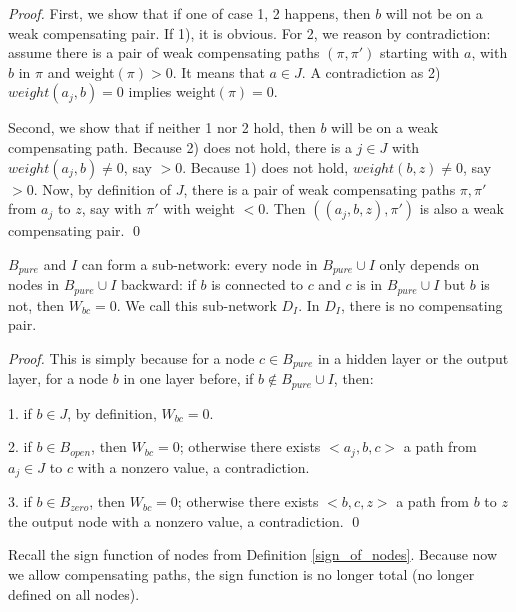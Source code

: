 			\begin{proof}
				First, we show that if one of case 1, 2 happens, then $b$ will not be on a weak compensating pair. If 1), it is obvious. For 2, we reason by contradiction: assume there is a pair of weak compensating paths 	$(\pi,\pi')$ starting with $a$, with $b$ in $\pi$ and weight$(\pi) > 0$. It means that $a \in J$. A contradiction as 2) $weight({a_j,b})=0$ implies weight$(\pi)=0$.
				
				Second, we show that if neither 1 nor 2 hold, then $b$ will be on a weak compensating path.
				Because 2) does not hold, there is a $j \in J$ with $weight({a_j,b}) \neq 0$, say $>0$.
				Because 1) does not hold, $weight({b,z}) \neq 0$, say $>0$.
				Now, by definition of $J$, there is a pair of weak compensating paths $\pi,\pi'$ 
				from $a_j$ to $z$, say with $\pi'$ with weight $<0$.
				Then $((a_j,b,z), \pi')$ is also a weak compensating pair. \qed
			\end{proof}
			
			\begin{lemma}\label{lem:subnetwork}
				$B_{pure}$ and $I$ can form a sub-network: every node in $B_{pure}\cup I$ only depends on nodes in $B_{pure}\cup I$ backward: if $b$ is connected to $c$ and $c$ is in $B_{pure}\cup I$ but $b$ is not, then $W_{bc}=0$. We call this sub-network $D_I$. In $D_I$, there is no compensating pair.
			\end{lemma}
			
			\begin{proof}
				This is simply because for a node $c\in B_{pure}$ in a hidden layer or the output layer, for a node $b$ in one layer before, if $b\notin B_{pure}\cup I$, then:
				
				1. if $b\in J$, by definition, $W_{bc}=0$.
				
				2. if $b\in B_{open}$, then $W_{bc}=0$; otherwise there exists $<a_j,b,c>$ a path from $a_j\in J$ to $c$ with a nonzero value, a contradiction.
				
				3. if $b\in B_{zero}$, then $W_{bc}=0$; otherwise there exists $<b,c,z>$ a path from $b$ to $z$ the output node with a nonzero value, a contradiction. \qed
			\end{proof}
			
			
			
			Recall the sign function of nodes from Definition \ref{sign_of_nodes}. Because now we allow compensating paths, the sign function is no longer total (no longer defined on all nodes).
			
